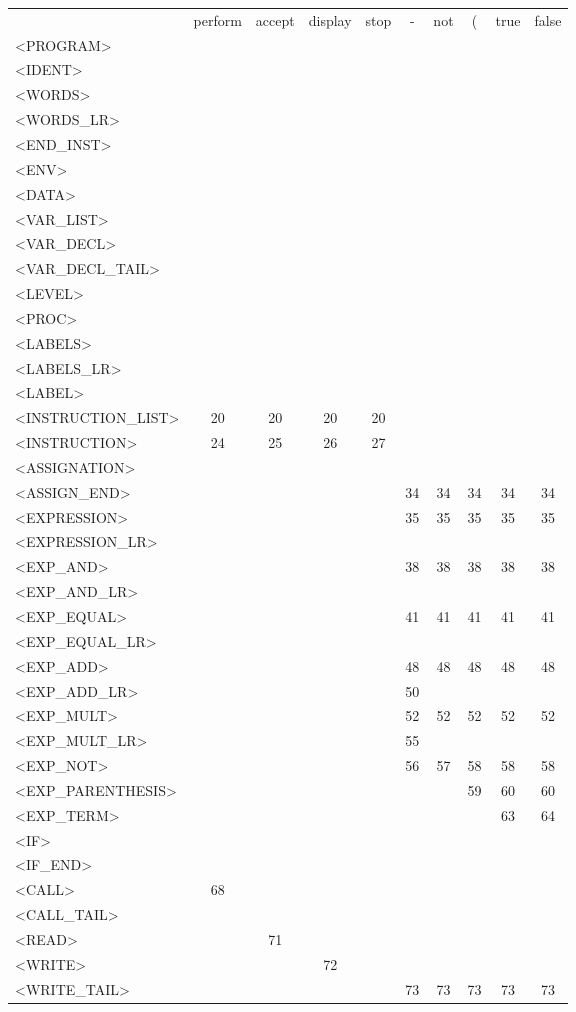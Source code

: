 \documentclass[a4paper,11pt]{article}
\begin{document}
\newpage
\begin{longtable}{l||ccccccccc}
	& perform & accept & display & stop & - & not & ( & true & false\\
	<PROGRAM> & & & & & & & & & \\
	<IDENT>& & & & & & & & & \\
	<WORDS> & & & & & & & & & \\
	<WORDS\_LR> & & & & & & & & & \\
	<END\_INST>& & & & & & & & & \\
	<ENV>& & & & & & & & & \\
	<DATA> & & & & & & & & & \\
	<VAR\_LIST>& & & & & & & & & \\
	<VAR\_DECL> & & & & & & & & & \\
	<VAR\_DECL\_TAIL>& & & & & & & & & \\
	<LEVEL>& & & & & & & & & \\
	<PROC>& & & & & & & & & \\
	<LABELS>& & & & & & & & & \\
	<LABELS\_LR> & & & & & & & & & \\
	<LABEL> & & & & & & & & & \\
	<INSTRUCTION\_LIST>& 20 & 20 & 20 & 20 & & & & & \\
	<INSTRUCTION>& 24 & 25 & 26 & 27 & & & & & \\
	<ASSIGNATION>& & & & & & & & & \\
	<ASSIGN\_END>& & & & & 34 & 34 & 34 & 34 & 34 \\
	<EXPRESSION> & & & & & 35 & 35 & 35 & 35 & 35 \\
	<EXPRESSION\_LR>& & & & & & & & & \\
	<EXP\_AND> & & & & & 38 & 38 & 38 & 38 & 38 \\
	<EXP\_AND\_LR>& & & & & & & & & \\
	<EXP\_EQUAL> & & & & & 41 & 41 & 41 & 41 & 41 \\
	<EXP\_EQUAL\_LR>& & & & & & & & & \\
	<EXP\_ADD> & & & & & 48 & 48 & 48 & 48 & 48 \\
	<EXP\_ADD\_LR>& & & & & 50 & & & & \\
	<EXP\_MULT> & & & & & 52 & 52 & 52 & 52 & 52 \\
	<EXP\_MULT\_LR>& & & & & 55 & & & & \\
	<EXP\_NOT> & & & & & 56 & 57 & 58 & 58 & 58 \\
	<EXP\_PARENTHESIS> & & & & & & & 59 & 60 & 60 \\
	<EXP\_TERM> & & & & & & & & 63 & 64 \\
	<IF> & & & & & & & & & \\
	<IF\_END> & & & & & & & & & \\
	<CALL> & 68 & & & & & & & & \\
	<CALL\_TAIL>& & & & & & & & & \\
	<READ> & & 71 & & & & & & & \\
	<WRITE>& & & 72 & & & & & & \\
	<WRITE\_TAIL> & & & & & 73 & 73 & 73 & 73 & 73 \\
\end{longtable}
\end{document}
